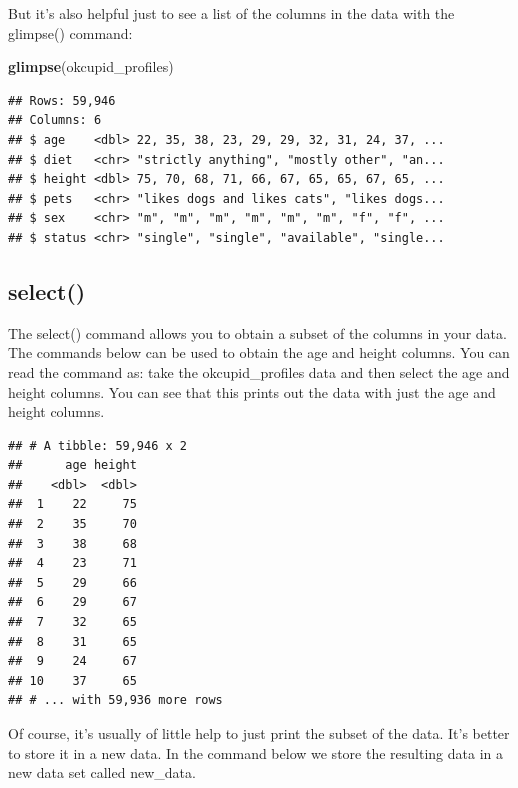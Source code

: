 \documentclass[
]{krantz}
\makeatletter
\newenvironment{Shaded}{\begin{snugshade}}{\end{snugshade}}
\newcommand{\KeywordTok}[1]{\textcolor[rgb]{0.27,0.27,0.27}{\textbf{#1}}}
\newcommand{\NormalTok}[1]{#1}
\newcommand{\OperatorTok}[1]{\textcolor[rgb]{0.43,0.43,0.43}{\textbf{#1}}}
\newcommand{\StringTok}[1]{\textcolor[rgb]{0.5,0.5,0.5}{#1}}
\newenvironment{kframe}{%
\medskip{}
\setlength{\fboxsep}{.8em}
 \def\at@end@of@kframe{}%
 \ifinner\ifhmode%
  \def\at@end@of@kframe{\end{minipage}}%
  \begin{minipage}{\columnwidth}%
 \fi\fi%
 \def\FrameCommand##1{\hskip\@totalleftmargin \hskip-\fboxsep
 \colorbox{shadecolor}{##1}\hskip-\fboxsep
     \hskip-\linewidth \hskip-\@totalleftmargin \hskip\columnwidth}%
 \MakeFramed {\advance\hsize-\width
   \@totalleftmargin\z@ \linewidth\hsize
   \@setminipage}}%
 {\par\unskip\endMakeFramed%
 \at@end@of@kframe}
\renewenvironment{Shaded}{\begin{kframe}}{\end{kframe}}
\makeatother
\begin{document}
But it's also helpful just to see a list of the columns in the data with the glimpse() command:

\begin{Shaded}
\begin{Highlighting}[]
\KeywordTok{glimpse}\NormalTok{(okcupid_profiles)}
\end{Highlighting}
\end{Shaded}

\begin{verbatim}
## Rows: 59,946
## Columns: 6
## $ age    <dbl> 22, 35, 38, 23, 29, 29, 32, 31, 24, 37, ...
## $ diet   <chr> "strictly anything", "mostly other", "an...
## $ height <dbl> 75, 70, 68, 71, 66, 67, 65, 65, 67, 65, ...
## $ pets   <chr> "likes dogs and likes cats", "likes dogs...
## $ sex    <chr> "m", "m", "m", "m", "m", "m", "f", "f", ...
## $ status <chr> "single", "single", "available", "single...
\end{verbatim}

\hypertarget{select}{%
\subsection{select()}\label{select}}

The select() command allows you to obtain a subset of the columns in your data. The commands below can be used to obtain the age and height columns. You can read the command as: take the okcupid\_profiles data and then select the age and height columns. You can see that this prints out the data with just the age and height columns.

\begin{Shaded}
\end{Shaded}

\begin{verbatim}
## # A tibble: 59,946 x 2
##      age height
##    <dbl>  <dbl>
##  1    22     75
##  2    35     70
##  3    38     68
##  4    23     71
##  5    29     66
##  6    29     67
##  7    32     65
##  8    31     65
##  9    24     67
## 10    37     65
## # ... with 59,936 more rows
\end{verbatim}

Of course, it's usually of little help to just print the subset of the data. It's better to store it in a new data. In the command below we store the resulting data in a new data set called new\_data.
\end{document}
